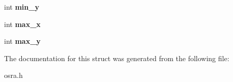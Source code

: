 \begin{DoxyCompactItemize}
\item 
\hypertarget{structatom__s_a0bb7ff26b1813370560a29dd997982eb}{int {\bfseries min\-\_\-y}}\label{structatom__s_a0bb7ff26b1813370560a29dd997982eb}

\item 
\hypertarget{structatom__s_a9aca92b5aa3eef087bc14da98d27aa5e}{int {\bfseries max\-\_\-x}}\label{structatom__s_a9aca92b5aa3eef087bc14da98d27aa5e}

\item 
\hypertarget{structatom__s_abe21937a50939d9c9e25b3d4d0da3ff0}{int {\bfseries max\-\_\-y}}\label{structatom__s_abe21937a50939d9c9e25b3d4d0da3ff0}

\end{DoxyCompactItemize}


The documentation for this struct was generated from the following file\-:\begin{DoxyCompactItemize}
\item 
osra.\-h\end{DoxyCompactItemize}

